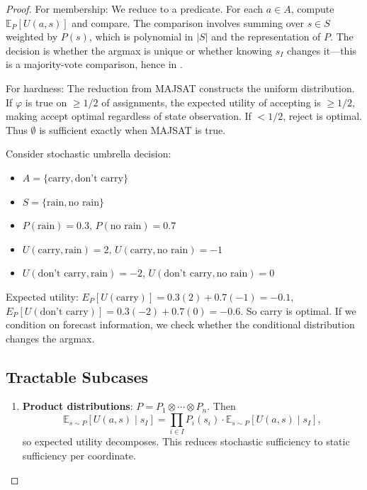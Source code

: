 
\begin{proof}
For membership: We reduce to a \PP predicate. For each $a \in A$, compute $\mathbb{E}_P[U(a,s)]$ and compare. The comparison involves summing over $s \in S$ weighted by $P(s)$, which is polynomial in $|S|$ and the representation of $P$. The decision is whether the argmax is unique or whether knowing $s_I$ changes it---this is a majority-vote comparison, hence in \PP.

For hardness: The reduction from MAJSAT constructs the uniform distribution. If $\varphi$ is true on $\geq 1/2$ of assignments, the expected utility of accepting is $\geq 1/2$, making accept optimal regardless of state observation. If $< 1/2$, reject is optimal. Thus $\emptyset$ is sufficient exactly when MAJSAT is true.
\endproof

\begin{example}
Consider stochastic umbrella decision:
\begin{itemize}
\item $A = \{\text{carry}, \text{don't carry}\}$
\item $S = \{\text{rain}, \text{no rain}\}$
\item $P(\text{rain}) = 0.3$, $P(\text{no rain}) = 0.7$
\item $U(\text{carry}, \text{rain}) = 2$, $U(\text{carry}, \text{no rain}) = -1$
\item $U(\text{don't carry}, \text{rain}) = -2$, $U(\text{don't carry}, \text{no rain}) = 0$
\end{itemize}
Expected utility: $E_P[U(\text{carry})] = 0.3(2) + 0.7(-1) = -0.1$, $E_P[U(\text{don't carry})] = 0.3(-2) + 0.7(0) = -0.6$. So carry is optimal. If we condition on forecast information, we check whether the conditional distribution changes the argmax.
\end{example}

\subsection{Tractable Subcases}

\begin{enumerate}
\item \textbf{Product distributions}: $P = P_1 \otimes \cdots \otimes P_n$. Then
\[
\mathbb{E}_{s \sim P}[U(a,s) \mid s_I] = \prod_{i \in I} P_i(s_i) \cdot \mathbb{E}_{s \sim P}[U(a,s) \mid s_I],
\]
so expected utility decomposes. This reduces stochastic sufficiency to static sufficiency per coordinate.


\end{enumerate}
\end{proof}
